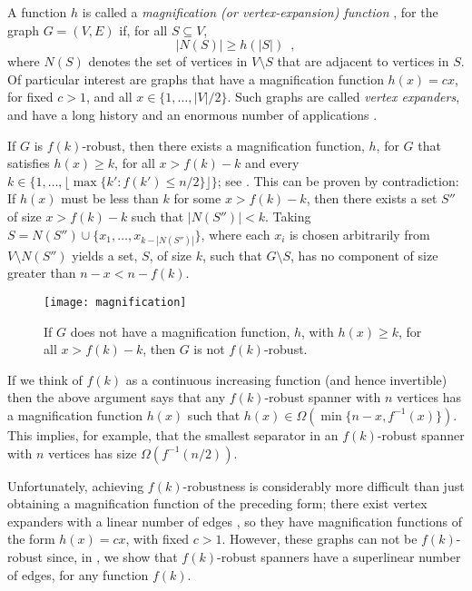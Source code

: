 \documentclass{patmorin}
\begin{document}
A function $h$ is called a \emph{magnification (or vertex-expansion)
function} \cite[Page~390]{kalai91}, for the graph $G=(V,E)$ if, for all
$S\subseteq V$,
\[
    |N(S)| \ge h(|S|) \enspace ,
\]
where $N(S)$ denotes the set of vertices in $V\setminus S$ that
are adjacent to vertices in $S$.  Of particular interest are graphs
that have a magnification function $h(x)=cx$, for fixed $c>1$, and
all $x\in\{1,\ldots,|V|/2\}$.  Such graphs are called \emph{vertex
expanders}, and have a long history and an enormous number of applications
\cite{hlw06}.

If $G$ is $f(k)$-robust, then there exists a magnification function,
$h$, for $G$ that satisfies $h(x) \ge k$, for all $x> f(k)-k$
and every $k\in\{1,\ldots,\lfloor\max\{k':f(k')\le n/2\}\rfloor\}$;
see .  This can be proven by contradiction:
If $h(x)$ must be less than $k$ for some $x> f(k)-k$, then there
exists a set $S''$ of size $x>f(k)-k$ such that $|N(S'')|< k$.  Taking
$S=N(S'')\cup\{x_1,\ldots,x_{k-|N(S'')|}\}$, where each $x_i$ is chosen
arbitrarily from $V\setminus N(S'')$ yields a set, $S$, of size $k$, such
that $G\setminus S$, has no component of size greater than $n-x < n-f(k)$.

\begin{figure}
  \begin{center}
    \texttt{[image: magnification]}
  \end{center}
  \caption{If $G$ does not have a magnification function, $h$, with
  $h(x)\ge k$, for all $x> f(k)-k$, then $G$ is not $f(k)$-robust.}
\end{figure}

If we think of $f(k)$ as a continuous increasing function (and
hence invertible) then the above argument says that any $f(k)$-robust
spanner with $n$ vertices has a magnification function $h(x)$ such that
$h(x)\in\Omega(\min\{n-x,f^{-1}(x)\})$.  This implies, for example, that the
smallest separator in an $f(k)$-robust spanner with $n$ vertices has
size $\Omega(f^{-1}(n/2))$.

Unfortunately, achieving $f(k)$-robustness is considerably more difficult
than just obtaining a magnification function of the preceding form;
there exist vertex expanders with a linear number of edges \cite{hlw06},
so they have magnification functions of the form $h(x)=cx$, with
fixed $c>1$.  However, these graphs can not be $f(k)$-robust since,
in , we show that $f(k)$-robust spanners
have a superlinear number of edges, for any function $f(k)$.
\end{document}
